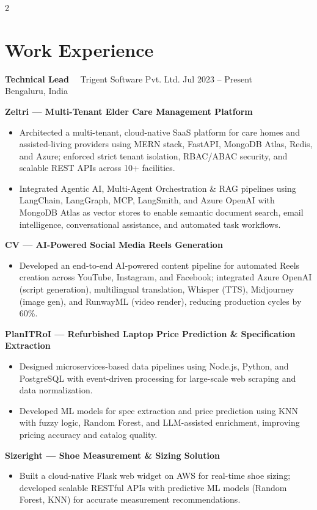 \documentclass[10pt,a4paper]{article}
\newcommand{\job}[4]{%
  \vspace{2pt}
  {\fontsize{10.5}{12}\bfseries\color{sidebar}#1}
  {\color{textmuted}\ \textbar\ #2}
  \hfill
  {\fontsize{8.8}{10}\color{accent}#3}\\
  {\fontsize{8.7}{10}\color{textmuted}#4}
  \vspace{1pt}
}
\newcommand{\project}[1]{%
  \vspace{2pt}
  {\fontsize{8.8}{10}\bfseries\color{sidebar}#1}\par
}
\begin{document}
\begin{paracol}{2}
\section{Work Experience}

\job{Technical Lead}{Trigent Software Pvt. Ltd.}{Jul 2023 -- Present}{Bengaluru, India}

\project{Zeltri — Multi-Tenant Elder Care Management Platform}
\begin{itemize}
  \item Architected a multi-tenant, cloud-native SaaS platform for care homes and assisted-living providers using MERN stack, FastAPI, MongoDB Atlas, Redis, and Azure; enforced strict tenant isolation, RBAC/ABAC security, and scalable REST APIs across 10+ facilities.
  \item Integrated Agentic AI, Multi-Agent Orchestration \& RAG pipelines using LangChain, LangGraph, MCP, LangSmith, and Azure OpenAI with MongoDB Atlas as vector stores to enable semantic document search, email intelligence, conversational assistance, and automated task workflows.
\end{itemize}

\project{CV — AI-Powered Social Media Reels Generation}
\begin{itemize}
  \item Developed an end-to-end AI-powered content pipeline for automated Reels creation across YouTube, Instagram, and Facebook; integrated Azure OpenAI (script generation), multilingual translation, Whisper (TTS), Midjourney (image gen), and RunwayML (video render), reducing production cycles by 60\%.
\end{itemize}

\project{PlanITRoI — Refurbished Laptop Price Prediction \& Specification Extraction}
\begin{itemize}
  \item Designed microservices-based data pipelines using Node.js, Python, and PostgreSQL with event-driven processing for large-scale web scraping and data normalization.
  \item Developed ML models for spec extraction and price prediction using KNN with fuzzy logic, Random Forest, and LLM-assisted enrichment, improving pricing accuracy and catalog quality.
\end{itemize}

\project{Sizeright — Shoe Measurement \& Sizing Solution}
\begin{itemize}
  \item Built a cloud-native Flask web widget on AWS for real-time shoe sizing; developed scalable RESTful APIs with predictive ML models (Random Forest, KNN) for accurate measurement recommendations.
\end{itemize}


\end{paracol}
\end{document}
